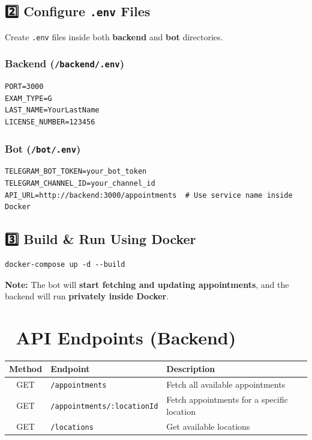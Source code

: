 \documentclass{article}
\begin{document}
\subsection*{2️⃣ Configure \texttt{.env} Files}
Create \texttt{.env} files inside both \textbf{backend} and \textbf{bot} directories.

\subsubsection*{Backend (\texttt{/backend/.env})}
\begin{verbatim}
PORT=3000
EXAM_TYPE=G
LAST_NAME=YourLastName
LICENSE_NUMBER=123456
\end{verbatim}

\subsubsection*{Bot (\texttt{/bot/.env})}
\begin{verbatim}
TELEGRAM_BOT_TOKEN=your_bot_token
TELEGRAM_CHANNEL_ID=your_channel_id
API_URL=http://backend:3000/appointments  # Use service name inside Docker
\end{verbatim}

\subsection*{3️⃣ Build \& Run Using Docker}
\begin{verbatim}
docker-compose up -d --build
\end{verbatim}

\textbf{Note:} The bot will \textbf{start fetching and updating appointments}, and the backend will run \textbf{privately inside Docker}.

\section*{📜 API Endpoints (Backend)}
\begin{center}
\begin{tabular}{|c|l|l|}
\hline
\textbf{Method} & \textbf{Endpoint} & \textbf{Description} \\
\hline
GET & \texttt{/appointments} & Fetch all available appointments \\
GET & \texttt{/appointments/:locationId} & Fetch appointments for a specific location \\
GET & \texttt{/locations} & Get available locations \\
\hline
\end{tabular}
\end{center}
\end{document}
